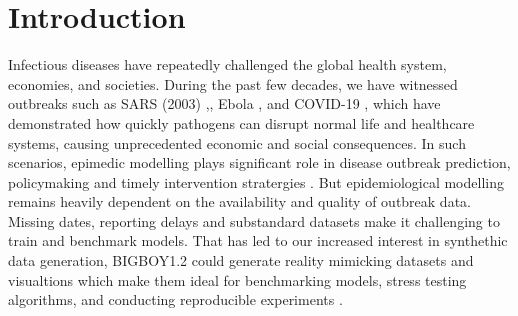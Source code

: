 \documentclass[11pt,a4paper]{article}
\theoremstyle{remark}\newtheorem{remark}{Remark}
\begin{document}
\section{Introduction}
Infectious diseases have repeatedly challenged the global health system, economies, and societies. During the past few decades, we have witnessed outbreaks such as SARS (2003) \citep{who_sars_2003},\citep{cdc_h1n1_2009}, Ebola \citep{who_ebola_2014}, and COVID-19 \citep{who_covid_2020}, which have demonstrated how quickly pathogens can disrupt normal life and healthcare systems, causing unprecedented economic and social consequences. In such scenarios, epimedic modelling plays significant role in disease outbreak prediction, policymaking and timely intervention stratergies \citep{keeling_rohani_2011}. But epidemiological modelling remains heavily dependent on the availability and quality of outbreak data. Missing dates, reporting delays and substandard datasets make it challenging to train and benchmark models. That has led to our increased interest in synthethic data generation, BIGBOY1.2 could generate reality mimicking datasets and visualtions which make them ideal for benchmarking models, stress testing algorithms, and conducting reproducible experiments \citep{goncalves_synthetic_2020}.
\end{document}
